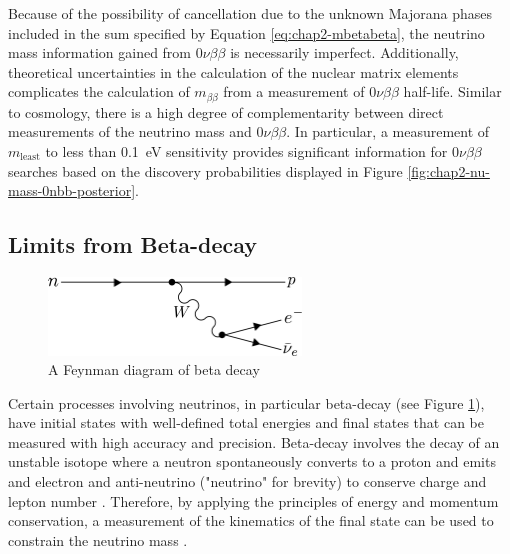 Because of the possibility of cancellation due to the unknown Majorana phases included in the sum specified by Equation \ref{eq:chap2-mbetabeta}, the neutrino mass information gained from $0\nu\beta\beta$ is necessarily imperfect. Additionally, theoretical uncertainties in the calculation of the nuclear matrix elements complicates the calculation of $m_{\beta\beta}$ from a measurement of $0\nu\beta\beta$ half-life. Similar to cosmology, there is a high degree of complementarity between direct measurements of the neutrino mass and $0\nu\beta\beta$. In particular, a measurement of $m_\textrm{least}$ to less than 0.1~eV sensitivity provides significant information for $0\nu\beta\beta$ searches based on the discovery probabilities displayed in Figure \ref{fig:chap2-nu-mass-0nbb-posterior}.

\subsection{Limits from Beta-decay}

\begin{figure}[htbp]
    \centering
    \includegraphics*[width=0.6\textwidth]{figs/Chapter-2/230717_betadecay.png}
    \caption{\label{fig:chap2-beta-decay-diagram} A Feynman diagram of beta decay}
\end{figure}

Certain processes involving neutrinos, in particular beta-decay (see Figure \ref{fig:chap2-beta-decay-diagram}), have initial states with well-defined total energies and final states that can be measured with high accuracy and precision. Beta-decay involves the decay of an unstable isotope where a neutron spontaneously converts to a proton and emits and electron and anti-neutrino ("neutrino" for brevity) to conserve charge and lepton number \cite{nuclear_physics}. Therefore, by applying the principles of energy and momentum conservation, a measurement of the kinematics of the final state can be used to constrain the neutrino mass \cite{FORMAGGIO20211}. 


